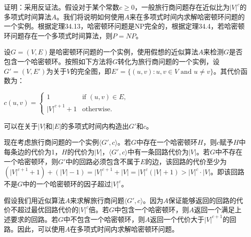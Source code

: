 \documentclass[./../main.tex]{subfiles} %
\begin{document}
证明：采用反证法。假设对于某个常数$c \geq 0$，一般旅行商问题存在近似比为$|V|^{c}$的多项式时间算法$A$。我们将说明如何使用$A$来在多项式时间内求解哈密顿环问题的一个实例。根据定理34.13，哈密顿环问题是NP完全的，根据定理34.4，若哈密顿环问题存在一个多项式时间算法，则$P=NP$。

设$G=(V,E)$是哈密顿环问题的一个实例，使用假想的近似算法$A$来检测$G$是否包含一个哈密顿环。按照如下方法将$G$转化为旅行商问题的一个实例，设$G'=(V,E')$为关于$V$的完全图，即$E'=\{(u,v):u,v\in V \text{ and } u\neq v\}$。其代价函数为：

$c(u,v)=\begin{cases}1 & \text{if }(u,v)\in E,\\|V|^{c+1}+1 & \text{otherwise.}\end{cases}$

可以在关于$|V|$和$|E|$的多项式时间内构造出$G'$和$c$。

现在考虑旅行商问题的一个实例$\langle G',c\rangle$。若$G$中存在一个哈密顿环$H$，则$c$赋予$H$中每条边的代价为1，$H$的代价为$|V|$，$\langle G',c\rangle$中有一条回路代价为$|V|$。若$G$中不存在一个哈密顿环，则$G'$中的回路必须包含不属于$E$的边，该回路的代价至少为$(|V|^{c+1}+1)+(|V|-1)=|V|^{c+1}+|V|=|V|^{c}(|V|+1)>|V|^{c}\cdot|V|$。即该回路不是$G$中的一个哈密顿环的因子超过$|V|^{c}$。

假设我们用近似算法$A$来求解旅行商问题$\langle G',c\rangle$。因为$A$保证能够返回的回路的代价不超过最优回路代价的$|V|^{c}$倍。若$G$中包含一个哈密顿环，则$A$返回一个满足上述要求的回路。若$G$中不包含一个哈密顿环，则$A$返回一个代价大于$|V|^{c+1}$的回路。因此，可以使用$A$在多项式时间内求解哈密顿环问题。
\end{document}
